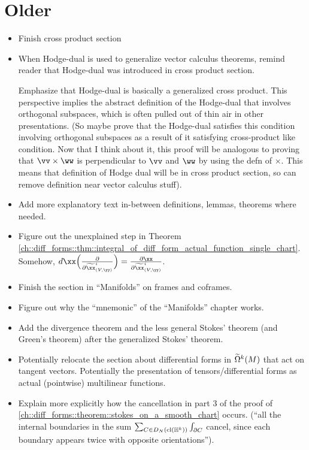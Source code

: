 \section*{Older}

\begin{itemize}
    \item Finish cross product section
    \item When Hodge-dual is used to generalize vector calculus theorems, remind reader that Hodge-dual was introduced in cross product section. 
    
    Emphasize that Hodge-dual is basically a generalized cross product. This perspective implies the abstract definition of the Hodge-dual that involves orthogonal subspaces, which is often pulled out of thin air in other presentations. (So maybe prove that the Hodge-dual satisfies this condition involving orthogonal subspaces as a result of it satisfying cross-product like condition. Now that I think about it, this proof will be analogous to proving that $\vv \times \ww$ is perpendicular to $\vv$ and $\ww$ by using the defn of $\times$. This means that definition of Hodge dual will be in cross product section, so can remove definition near vector calculus stuff).
    \item Add more explanatory text in-between definitions, lemmas, theorems where needed.
    \item Figure out the unexplained step in Theorem \ref{ch::diff_forms::thm::integral_of_diff_form_actual_function_single_chart}. Somehow, $d\xx \Big( \frac{\pd}{\pd \tx^i_{(V, \yy)}} \Big) = \frac{\pd \xx}{\pd \tx^i_{(V, \yy)}}$. 
    \item Finish the section in ``Manifolds'' on frames and coframes.
    \item Figure out why the ``mnemonic'' of the ``Manifolds'' chapter works.
    \item Add the divergence theorem and the less general Stokes' theorem (and Green's theorem) after the generalized Stokes' theorem.
    \item Potentially relocate the section about differential forms in $\widetilde{\Omega}^k(M)$ that act on tangent vectors. Potentially the presentation of  tensors/differential forms as actual (pointwise) multilinear functions.
    \item Explain more explicitly how the cancellation in part 3 of the proof of \ref{ch::diff_forms::theorem::stokes_on_a_smooth_chart} occurs. (``all the internal boundaries in the sum $\sum_{C \in D_N(\text{cl}(\mathbb{H}^k))} \int_{\partial C}$ cancel, since each boundary appears twice with opposite orientations'').
\end{itemize}